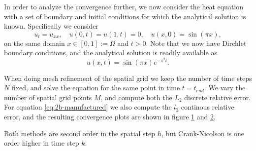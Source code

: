 In order to analyze the convergence further, 
we now consider the heat equation with a set of boundary and initial conditions for which the analytical solution is known. 
Specifically we consider 
\begin{equation}
    u_t = u_{xx}, \quad u(0,t) = u(1,t) = 0, \quad u(x,0) = \sin(\pi x), 
    \label{eq:2b-manufactured}
\end{equation}
on the same domain $x \in [0,1] := \Omega$ and $t > 0$. 
Note that we now have Dirchlet boundary conditions, 
and the analytical solution is readily available as
\begin{equation}
    u(x,t) = \sin(\pi x)  e^{- \pi^2 t}.
\end{equation}

When doing mesh refinement of the spatial grid we keep the number of time steps $N$ fixed, 
and solve the equation for the same point in time $t=t_{end}$. 
We vary the number of spatial grid points $M$, 
and compute both the $L_2$ discrete relative error. 
For equation \eqref{eq:2b-manufactured} we also compute the $l_2$ continous relative error, 
and the resulting convergence plots are shown in figure \ref{fig:2a-convergence} and \ref{fig:2b-convergence}. 

Both methods are second order in the spatial step $h$, 
but Crank-Nicolson is one order higher in time step $k$. 

\begin{figure}[ht]
    \centering
    
    \label{fig:2a-convergence}
\end{figure}

\begin{figure}[ht]
    \centering
    
    \label{fig:2b-convergence}
\end{figure}


%
%    

